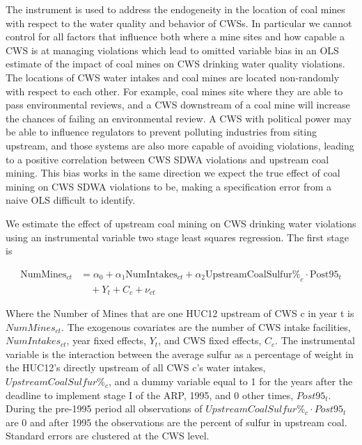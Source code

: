 \documentclass{article}
\begin{document}
The instrument is used to address the endogeneity in the location of coal mines with respect to the water quality and behavior of CWSs. In particular we cannot control for all factors that influence both where a mine sites and how capable a CWS is at managing violations which lead to omitted variable bias in an OLS estimate of the impact of coal mines on CWS drinking water quality violations. The locations of CWS water intakes and coal mines are located non-randomly with respect to each other. For example, coal mines site where they are able to pass environmental reviews, and a CWS downstream of a coal mine will increase the chances of failing an environmental review. A CWS with political power may be able to influence regulators to prevent polluting industries from siting upstream, and those systems are also more capable of avoiding violations, leading to a positive correlation between CWS SDWA violations and upstream coal mining. This bias works in the same direction we expect the true effect of coal mining on CWS SDWA violations to be, making a specification error from a naive OLS difficult to identify.

We estimate the effect of upstream coal mining on CWS drinking water violations using an instrumental variable two stage least squares regression. The first stage is

\begin{equation}\label{1ststage2sls}
\begin{split}
\text{NumMines}_{ct} &= \alpha_0 + \alpha_1\text{NumIntakes}_{ct} + \alpha_2\text{UpstreamCoalSulfur\%}_c \cdot \text{Post95}_t \\
&\quad + Y_t + C_c + \nu_{ct}
\end{split}
\end{equation}

Where the Number of Mines that are one HUC12 upstream of CWS c in year t is $NumMines_{ct}$. The exogenous covariates are the number of CWS intake facilities, $NumIntakes_{ct}$, year fixed effects, $Y_t$, and CWS fixed effects, $C_c$. The instrumental variable is the interaction between the average sulfur as a percentage of weight in the HUC12's directly upstream of all CWS c's water intakes, $UpstreamCoalSulfur\%_c$, and a dummy variable equal to 1 for the years after the deadline to implement stage I of the ARP, 1995, and 0 other times, $Post95_t$. During the pre-1995 period all observations of $UpstreamCoalSulfur\%_c \cdot Post95_t$ are 0 and after 1995 the observations are the percent of sulfur in upstream coal. Standard errors are clustered at the CWS level. 
\end{document}
